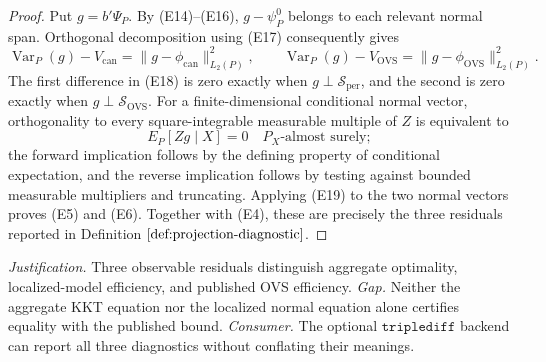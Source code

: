 \documentclass{article}
\begin{document}
\begin{proof}
Put \(g=b'\Psi_P\).  By (E14)--(E16), \(g-\psi_P^0\) belongs to each relevant normal span.  Orthogonal decomposition using (E17) consequently gives
\[
 \operatorname{Var}_P(g)-V_{\mathrm{can}}
 =\|g-\phi_{\mathrm{can}}\|_{L_2(P)}^2,
 \qquad
 \operatorname{Var}_P(g)-V_{\mathrm{OVS}}
 =\|g-\phi_{\mathrm{OVS}}\|_{L_2(P)}^2.
\tag{E18}
\]
The first difference in (E18) is zero exactly when \(g\perp\mathscr S_{\mathrm{per}}\), and the second is zero exactly when \(g\perp\mathscr S_{\mathrm{OVS}}\).  For a finite-dimensional conditional normal vector, orthogonality to every square-integrable measurable multiple of \(Z\) is equivalent to
\[
 E_P[Zg\mid X]=0
\quad P_X\text{-almost surely};
\tag{E19}
\]
the forward implication follows by the defining property of conditional expectation, and the reverse implication follows by testing against bounded measurable multipliers and truncating.  Applying (E19) to the two normal vectors proves (E5) and (E6).  Together with (E4), these are precisely the three residuals reported in Definition \(\ref{def:projection-diagnostic}\).
\end{proof}
\par\smallskip\noindent \textit{Justification.} Three observable residuals distinguish aggregate optimality, localized-model efficiency, and published OVS efficiency. \textit{Gap.} Neither the aggregate KKT equation nor the localized normal equation alone certifies equality with the published bound. \textit{Consumer.} The optional \(\texttt{triplediff}\) backend can report all three diagnostics without conflating their meanings.
\end{document}
